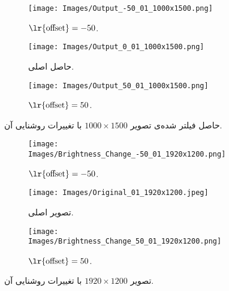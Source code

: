 \documentclass[12pt,onecolumn,a4paper]{article}
\begin{document}
\begin{figure}
     \centering
     \begin{subfigure}[b]{0.3\textwidth}
         \centering
         \texttt{[image: Images/Output\_-50\_01\_1000x1500.png]}
         \caption{$\text{\lr{offset}}=-50$.}
         \label{Figure:Output_01_1000x1500_-50}
     \end{subfigure}
     \hfill
     \begin{subfigure}[b]{0.3\textwidth}
         \centering
         \texttt{[image: Images/Output\_0\_01\_1000x1500.png]}
         \caption{حاصل اصلی.}
         \label{Figure:Output_01_1000x1500_0}
     \end{subfigure}
     \hfill
     \begin{subfigure}[b]{0.3\textwidth}
         \centering
         \texttt{[image: Images/Output\_50\_01\_1000x1500.png]}
         \caption{$\text{\lr{offset}}=50$.}
         \label{Figure:Output_01_1000x1500_50}
     \end{subfigure}
\caption{حاصل فیلتر شده‌ی تصویر $1000 \times 1500$ با تغییرات روشنایی آن.}
\label{Figure:Output_01_1000x1500}
\end{figure}

\begin{figure}
     \centering
     \begin{subfigure}[b]{0.3\textwidth}
         \centering
         \texttt{[image: Images/Brightness\_Change\_-50\_01\_1920x1200.png]}
         \caption{$\text{\lr{offset}}=-50$.}
         \label{Figure:01_1920x1200_-50}
     \end{subfigure}
     \hfill
     \begin{subfigure}[b]{0.3\textwidth}
         \centering
         \texttt{[image: Images/Original\_01\_1920x1200.jpeg]}
         \caption{تصویر اصلی.}
         \label{Figure:01_1920x1200_0}
     \end{subfigure}
     \hfill
     \begin{subfigure}[b]{0.3\textwidth}
         \centering
         \texttt{[image: Images/Brightness\_Change\_50\_01\_1920x1200.png]}
         \caption{$\text{\lr{offset}}=50$.}
         \label{Figure:01_1920x1200_50}
     \end{subfigure}
\caption{تصویر $1920 \times 1200$ با تغییرات روشنایی آن.}
\label{Figure:01_1920x1200}
\end{figure}
\end{document}
